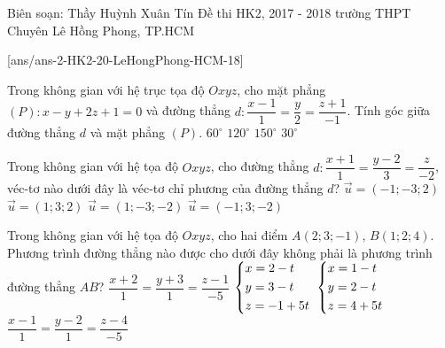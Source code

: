 
\begin{name}
{Biên soạn: Thầy Huỳnh Xuân Tín}
{Đề thi HK2, 2017 - 2018 trường THPT Chuyên Lê Hồng Phong, TP.HCM}

\end{name}
\setcounter{ex}{0}\setcounter{bt}{0}
[ans/ans-2-HK2-20-LeHongPhong-HCM-18]

\begin{ex}%
	Trong không gian với hệ trục tọa độ $Oxyz$, cho mặt phẳng $(P) \colon x-y+2z+1=0$ và đường thẳng $d: \dfrac{x-1}{1}=\dfrac{y}{2}=\dfrac{z+1}{-1}$. Tính góc giữa đường thẳng $d$ và mặt phẳng $(P)$.
	\choice
	{$60^{\circ} $}
	{$120^{\circ} $}
	{$150^{\circ} $}
	{\True $30^{\circ} $}
\end{ex}

\begin{ex}%
	Trong không gian với hệ tọa độ $Oxyz$, cho đường thẳng $d \colon \dfrac{x+1}{1}=\dfrac{y-2}{3}=\dfrac{z}{-2}$, véc-tơ nào dưới đây là véc-tơ chỉ phương của đường thẳng $d$?
	\choice
	{\True $\vec{u}=(-1;-3;2) $}
	{$\vec{u}=(1;3;2) $}
	{$\vec{u}=(1;-3;-2) $}
	{ $\vec{u}=(-1;3;-2) $}
\end{ex}

\begin{ex}%
	Trong không gian với hệ tọa độ $Oxyz$, cho hai điểm $A(2;3;-1)$, $B(1;2;4)$. Phương trình đường thẳng nào được cho dưới đây không phải là phương trình đường thẳng $AB$?
	\choice
	{\True $\dfrac{x+2}{1}=\dfrac{y+3}{1}=\dfrac{z-1}{-5} $}
	{$\left\{\begin{aligned}&x=2-t\\&y=3-t\\&z=-1+5t\end{aligned}\right. $}
	{$\left\{\begin{aligned}&x=1-t\\&y=2-t\\&z=4+5t\end{aligned}\right. $}
	{ $\dfrac{x-1}{1}=\dfrac{y-2}{1}=\dfrac{z-4}{-5} $}
\end{ex}

